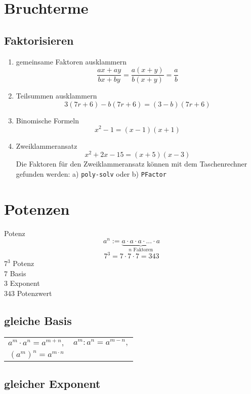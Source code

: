 \begin{multicols}{2}
\hrulefill

\section{Bruchterme}
\subsection{Faktorisieren}
\begin{rezept}{}{}
\begin{enumerate}
\item gemeinsame Faktoren ausklammern
$$\frac{ax+ay}{bx+by} =\frac{a(x+y)}{b(x+y)} = \frac{a}b$$
\item Teilsummen ausklammern
$$3(7r+6) - b(7r+6) = (3-b)(7r+6)$$
\item Binomische Formeln
$$x^2-1 = (x-1)(x+1)$$
\item Zweiklammeransatz
$$x^2+2x-15 = (x+5)(x-3)$$
Die Faktoren für den Zweiklammeransatz können mit dem Taschenrechner
gefunden werden: a) \texttt{poly-solv} 
oder b) \texttt{PFactor} 
\end{enumerate}
\end{rezept}


\section{Potenzen}
\begin{definition}{Potenz}{}
$$a^n := \underbrace{a\cdot{}a\cdot{}a\cdot{}...\cdot{}a}_{n\textrm{ Faktoren}}$$
$$7^3=7\cdot{}7\cdot{}7=343$$
$7^3$ Potenz\\
$7$ Basis\\
$3$ Exponent\\
$343$ Potenzwert\\
\end{definition}

\subsection{gleiche Basis}
\begin{tabular}{cc}
$a^m\cdot{}a^n = a^{m+n},$ & $a^m:a^n=a^{m-n},$ \\
$\left(a^m\right)^n = a^{m\cdot{}n}$ &\\
 \end{tabular} 

\subsection{gleicher Exponent}


\end{multicols}
